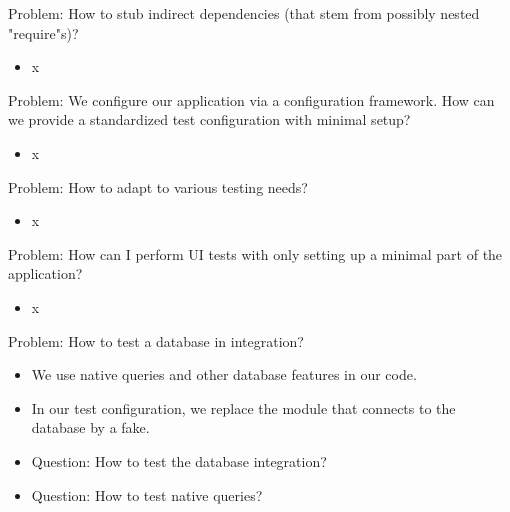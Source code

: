 \begin{frame}{Problem: How to stub indirect dependencies (that stem from possibly nested "require"s)?}
\begin{itemize}
\item x
\end{itemize}
\end{frame}

\begin{frame}{Problem: We configure our application via a configuration framework. How can we provide a standardized test configuration with minimal setup?}
\begin{itemize}
\item x
\end{itemize}
\end{frame}


% 
\begin{frame}{Problem: How to adapt to various testing needs?}
\begin{itemize}
\item x
\end{itemize}
\end{frame}


\begin{frame}{Problem: How can I perform UI tests with only setting up a minimal part of  the application?}
\begin{itemize}
\item x
\end{itemize}
\end{frame}


\begin{frame}{Problem: How to test a database in integration?}
\begin{itemize}
\item We use native queries and other database features in our code.
\item In our test configuration, we replace the module that connects to the database by a fake.
\end{itemize}

\begin{itemize}
\item Question: How to test the database integration?
\item Question: How to test native queries?
\end{itemize}
\end{frame}

